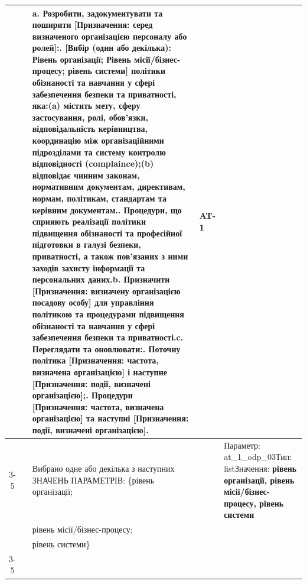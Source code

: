 \documentclass[10pt]{article}
\begin{document}
\begin{longtable}{|c|>{\raggedright\arraybackslash}p{4cm}|>{\raggedright\arraybackslash}p{6cm}|>{\raggedright\arraybackslash}p{1.5cm}|>{\raggedright\arraybackslash}p{3.5cm}|}
 &  & a. Розробити, задокументувати та поширити [Призначення: серед визначеного організацією персоналу або ролей]:\newline 1. [Вибір (один або декілька): Рівень організації; Рівень місії/бізнес-процесу; рівень системи] політики обізнаності та навчання у сфері забезпечення безпеки та приватності, яка:\newline (a) містить мету, сферу застосування, ролі, обов'язки, відповідальність керівництва, координацію між організаційними підрозділами та систему контролю відповідності (complaince);\newline (b) відповідає чинним законам, нормативним документам, директивам, нормам, політикам, стандартам та керівним документам.\newline 2. Процедури, що сприяють реалізації політики підвищення обізнаності та професійної підготовки в галузі безпеки, приватності, а також пов'язаних з ними заходів захисту інформації та персональних даних.\newline b. Призначити [Призначення: визначену організацією посадову особу] для управління політикою та процедурами підвищення обізнаності та навчання у сфері забезпечення безпеки та приватності.\newline c. Переглядати та оновлювати:\newline 1. Поточну політика [Призначення: частота, визначена організацією] і наступне [Призначення: події, визначені організацією];\newline 2. Процедури [Призначення: частота, визначена організацією] та наступні [Призначення: події, визначені організацією]. & AT-1 & \\ \cline{3-5}
 &  & Вибрано одне або декілька з наступних ЗНАЧЕНЬ ПАРАМЕТРІВ: \{рівень організації; &  & Параметр: at\_\allowbreak{}1\_\allowbreak{}odp\_\allowbreak{}03\newline Тип: list\newline Значення: \textbf{рівень організації, рівень місії/бізнес-процесу, рівень системи} \\ 
 &  & рівень місії/бізнес-процесу; &  &  \\ 
 &  & рівень системи\} &  &  \\ \cline{3-5}

\end{longtable}
\end{document}
